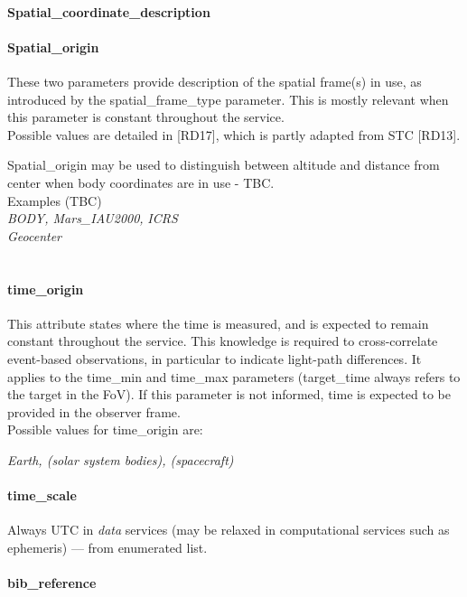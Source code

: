 \documentclass[11pt,a4paper]{ivoa}
\begin{document}
\paragraph{Spatial\_coordinate\_description}

\paragraph{\textbf{Spatial\_origin} }

These two parameters provide description of the spatial frame(s) in use, as introduced by the spatial\_frame\_type parameter. This is mostly relevant when this parameter is constant throughout the service.\\ Possible values are detailed in [RD17], which is partly adapted from STC [RD13].

Spatial\_origin may be used to distinguish between altitude and distance from center when body coordinates are in use - TBC.\\ Examples (TBC)\\ \emph{BODY, Mars\_IAU2000, }\emph{ICRS}\\\emph{Geocenter } \\\\

\paragraph{time\_origin}

This attribute states where the time is measured, and is expected to remain constant throughout the service. This knowledge is required to cross-correlate event-based observations, in particular to indicate light-path differences. It applies to the time\_min and time\_max parameters (target\_time always refers to the target in the FoV). If this parameter is not informed, time is expected to be provided in the observer frame.\\ Possible values for time\_origin are:

\emph{Earth, (solar system bodies), (spacecraft)}

\paragraph{time\_scale}

Always UTC in \emph{data} services (may be relaxed in computational services such as ephemeris) — from enumerated list.

\paragraph{bib\_reference}
\end{document}

